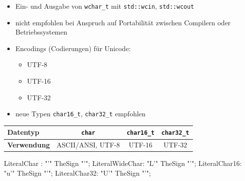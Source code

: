 \documentclass[a4paper]{report}
\begin{document}
\begin{itemize}
\begin{itemize}
		\item  Ein- und Ausgabe von \texttt{wchar\_t} mit \texttt{std::wcin}, \texttt{std::wcout}
		\item nicht empfohlen bei Anspruch auf Portabilität zwischen Compilern oder Betriebssystemen
		\bigskip
		\item Encodings (Codierungen) für Unicode:
		\begin{itemize}
			\item UTF-8
			\item UTF-16
			\item UTF-32
		\end{itemize}
		\item neue Typen \texttt{char16\_t}, \texttt{char32\_t} empfohlen
	\end{itemize}
		
\end{itemize}
\begin{center}
\begin{tabular}{|p{4cm}|c|c|c|} \hline
	\textbf{Datentyp} & \texttt{char} & \texttt{char16\_t} & \texttt{char32\_t} \\ \hline %
	\textbf{Verwendung}  & ASCII/ANSI, UTF-8 & UTF-16 & UTF-32 \\ \hline %
\end{tabular}
\end{center}

\begin{rail}
	LiteralChar : "'" TheSign "'";
	LiteralWideChar: "L'" TheSign "'";
	LiteralChar16: "u'" TheSign "'";
	LiteralChar32: "U'" TheSign "'";
\end{rail}
\end{document}
